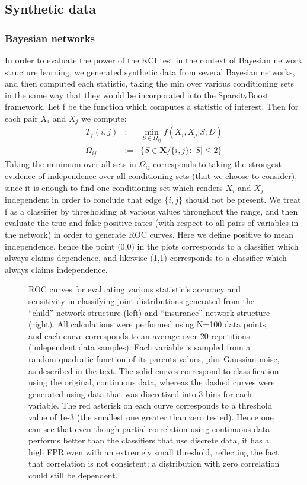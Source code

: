 \documentclass{article} %
\begin{document}
\subsection{Synthetic data}

\subsubsection{Bayesian networks}
In order to evaluate the power of the KCI test in the context of Bayesian network structure learning, we generated synthetic data from several Bayesian networks, and then computed each statistic, taking the min over various conditioning sets in the same way that they would be incorporated into the SparsityBoost framework.  Let f be the function which computes a statistic of interest. Then for each pair $X_i$ and $X_j$ we compute:  \begin{eqnarray*} T_f(i,j) &:=& \min_{S \in \Omega_{ij} } f(X_i,X_j | S; D) \\ \Omega_{ij} &:=& \{ S \in \mathbf{X} / \{i,j\} : |S| \leq 2 \} \end{eqnarray*}  Taking the minimum over all sets in $\Omega_{ij}$ corresponds to taking the strongest evidence of independence over all conditioning sets (that we choose to consider), since it is enough to find one conditioning set which renders $X_i$ and $X_j$ independent in order to conclude that edge $\{i,j\}$ should not be present.  We treat f as a classifier by thresholding at various values throughout the range, and then evaluate the true and false positive rates (with respect to all pairs of variables in the network) in order to generate ROC curves.  Here we define positive to mean independence, hence the point (0,0) in the plots corresponds to a classifier which always claims dependence, and likewise (1,1) corresponds to a classifier which always claims independence.

\begin{figure}[h]
\centering
    \quad
\caption{ROC curves for evaluating various statistic's accuracy and sensitivity in classifying joint distributions generated from the ``child'' network structure (left) and ``insurance'' network structure (right).  All calculations were performed using N=100 data points, and each curve corresponds to an average over 20 repetitions (independent data samples).  Each variable is sampled from a random quadratic function of its parents values, plus Gaussian noise, as described in the text.  The solid curves correspond to classification using the original, continuous data, whereas the dashed curves were generated using data that was discretized into 3 bins for each variable.  The red asterisk on each curve corresponds to a threshold value of 1e-3 (the smallest one greater than zero tested).  Hence one can see that even though partial correlation using continuous data performs better than the classifiers that use discrete data, it has a high FPR even with an extremely small threshold, reflecting the fact that correlation is not consistent; a distribution with zero correlation could still be dependent. }
\label{fig:ROC}
\end{figure}
\end{document}
